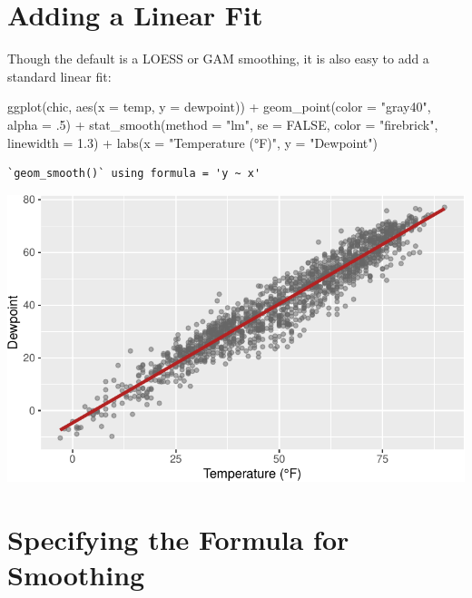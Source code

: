 \documentclass[
  letterpaper,
]{scrbook}
\newenvironment{Shaded}{\begin{snugshade}}{\end{snugshade}}
\newcommand{\AttributeTok}[1]{\textcolor[rgb]{0.40,0.45,0.13}{#1}}
\newcommand{\ConstantTok}[1]{\textcolor[rgb]{0.56,0.35,0.01}{#1}}
\newcommand{\DecValTok}[1]{\textcolor[rgb]{0.68,0.00,0.00}{#1}}
\newcommand{\FloatTok}[1]{\textcolor[rgb]{0.68,0.00,0.00}{#1}}
\newcommand{\FunctionTok}[1]{\textcolor[rgb]{0.28,0.35,0.67}{#1}}
\newcommand{\NormalTok}[1]{\textcolor[rgb]{0.00,0.23,0.31}{#1}}
\newcommand{\SpecialCharTok}[1]{\textcolor[rgb]{0.37,0.37,0.37}{#1}}
\newcommand{\StringTok}[1]{\textcolor[rgb]{0.13,0.47,0.30}{#1}}
\begin{document}
\section{Adding a Linear Fit}\label{adding-a-linear-fit}

Though the default is a LOESS or GAM smoothing, it is also easy to add a
standard linear fit:

\begin{Shaded}
\begin{Highlighting}[]
\FunctionTok{ggplot}\NormalTok{(chic, }\FunctionTok{aes}\NormalTok{(}\AttributeTok{x =}\NormalTok{ temp, }\AttributeTok{y =}\NormalTok{ dewpoint)) }\SpecialCharTok{+}
   \FunctionTok{geom\_point}\NormalTok{(}\AttributeTok{color =} \StringTok{"gray40"}\NormalTok{, }\AttributeTok{alpha =}\NormalTok{ .}\DecValTok{5}\NormalTok{) }\SpecialCharTok{+}
   \FunctionTok{stat\_smooth}\NormalTok{(}\AttributeTok{method =} \StringTok{"lm"}\NormalTok{, }\AttributeTok{se =} \ConstantTok{FALSE}\NormalTok{,}
               \AttributeTok{color =} \StringTok{"firebrick"}\NormalTok{, }\AttributeTok{linewidth =} \FloatTok{1.3}\NormalTok{) }\SpecialCharTok{+}
   \FunctionTok{labs}\NormalTok{(}\AttributeTok{x =} \StringTok{"Temperature (°F)"}\NormalTok{, }\AttributeTok{y =} \StringTok{"Dewpoint"}\NormalTok{)}
\end{Highlighting}
\end{Shaded}

\begin{verbatim}
`geom_smooth()` using formula = 'y ~ x'
\end{verbatim}

\includegraphics{ch17_files/figure-pdf/LM-1.pdf}

\section{Specifying the Formula for
Smoothing}\label{specifying-the-formula-for-smoothing}
\end{document}
